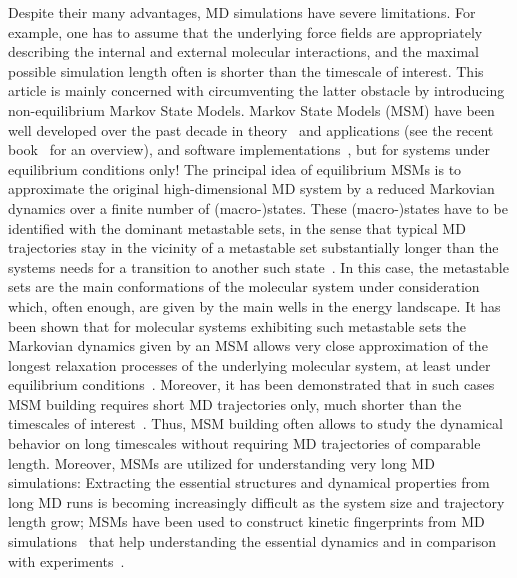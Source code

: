 \documentclass[aps, pre, preprint,unsortedaddress,a4paper,onecolumn,showkeys]{revtex4}
\begin{document}
Despite their many advantages, MD simulations have severe limitations. For example, one has to assume that the underlying force fields are appropriately describing the internal and external molecular interactions, and the maximal possible simulation length often is shorter than the timescale of interest. 
This article is mainly concerned with circumventing the latter obstacle by introducing non-equilibrium Markov State Models. Markov State Models
(MSM) have been well developed over the
past decade in theory~\cite{A19-31,prinz2011markov} and applications (see the recent book~\cite{A19-1} for an overview), and software implementations~\cite{A19-49, MSMBuilder}, but for systems under equilibrium conditions only!  
The principal idea of equilibrium MSMs is to approximate the original high-dimensional MD system by
a reduced Markovian dynamics over a finite number of (macro-)states. These (macro-)states
have to be identified with the dominant metastable sets, in the sense that
typical MD trajectories stay in the vicinity of a metastable set substantially longer than
the systems needs for a transition to another such state~\cite{A19-31,schuette2011markov}. In this case, the metastable sets are the main conformations of the molecular system under consideration which, often enough, are given by the main wells in the energy landscape. 
It has been shown that for molecular systems exhibiting such metastable sets the Markovian dynamics given by an MSM allows very close approximation of the longest relaxation processes of the underlying molecular system, at least under equilibrium conditions~\cite{sarich2010approximation,Eigenvalues}. 
Moreover, it has been demonstrated that in such cases MSM building requires short MD trajectories only, much shorter than the timescales of interest~\cite{PNAS09,kohlhoff2014cloud}.  
Thus, MSM building often allows to study the dynamical behavior on long timescales without requiring MD trajectories of comparable length.
Moreover, MSMs are utilized for understanding very long MD simulations: Extracting the essential structures and dynamical properties from long MD runs is
becoming increasingly difficult as the system size and trajectory length grow; MSMs have been used to construct kinetic fingerprints from MD simulations~\cite{A19-39} that help understanding the essential dynamics and in comparison with experiments~\cite{PrinzKellerNoe_PCCP11_Perspective}.


\end{document}

